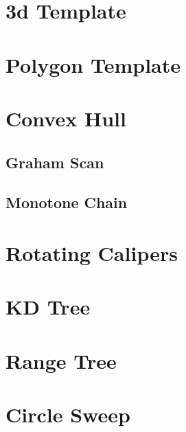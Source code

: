 \documentclass[10pt,a4paper]{report}
\begin{document}
	\section{3d Template}
	\section{Polygon Template}
	\section{Convex Hull}
		\subsection{Graham Scan}
		\subsection{Monotone Chain}
	\section{Rotating Calipers}
	\section{KD Tree}
	\section{Range Tree}
	\section{Circle Sweep}
	
\end{document}
